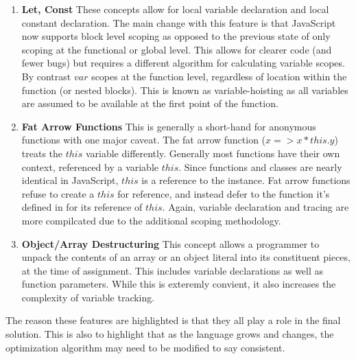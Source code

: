   \begin{enumerate}
    \item \textbf{Let, Const} These concepts allow for local variable declaration and local constant declaration.  The main change with this feature is that JavaScript now supports block level scoping as opposed to the previous state of only scoping at the functional or global level.  This allows for clearer code (and fewer bugs) but requires a different algorithm for calculating variable scopes.  By contrast $var$ scopes at the function level, regardless of location within the function (or nested blocks).  This is known as variable-hoisting as all variables are assumed to be available at the first point of the function.
    \item \textbf{Fat Arrow Functions} This is generally a short-hand for anonymous functions with one major caveat.  The fat arrow function ($x => x * this.y$) treats the $this$ variable differently.  Generally most functions have their own context, referenced by a variable $this$.  Since functions and classes are nearly identical in JavaScript, $this$ is a reference to the instance.  Fat arrow functions refuse to create a $this$ for reference, and instead defer to the function it's defined in for its reference of $this$. Again, variable declaration and tracing are more compilcated due to the additional scoping methodology.
    \item \textbf{Object/Array Destructuring}  This concept allows a programmer to unpack the contents of an array or an object literal into its constituent pieces, at the time of assignment.  This includes variable declarations as well as function parameters.  While this is exteremly convient, it also increases the complexity of variable tracking.  
  \end{enumerate}

The reason these features are highlighted is that they all play a role in the final solution.  This is also to highlight that as the language grows and changes, the optimization algorithm may need to be modified to say consistent. 